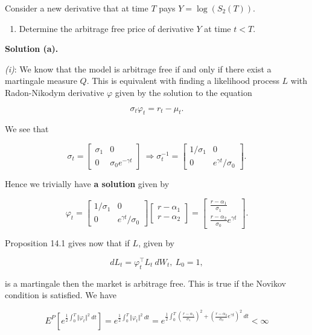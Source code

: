 \documentclass[
]{article}
\providecommand{\tightlist}{%
  \setlength{\itemsep}{0pt}\setlength{\parskip}{0pt}}
\begin{document}
Consider a new derivative that at time \(T\) pays \(Y=\log(S_2(T))\).

\begin{enumerate}
\def\labelenumi{\alph{enumi}.}
\setcounter{enumi}{2}
\tightlist
\item
  Determine the arbitrage free price of derivative \(Y\) at time
  \(t<T\).
\end{enumerate}

\textbf{Solution (a).}

\emph{(i)}: We know that the model is arbitrage free if and only if
there exist a martingale measure \(Q\). This is equivalent with finding
a likelihood process \(L\) with Radon-Nikodym derivative \(\varphi\)
given by the solution to the equation

\[
\sigma_t\varphi_t=r_t-\mu_t.
\]

We see that

\[
\sigma_t=
\begin{bmatrix}
\sigma_1 & 0\\
0 & \sigma_0e^{-\gamma t}
\end{bmatrix}\ \Rightarrow
\sigma_t^{-1}=
\begin{bmatrix}
1/\sigma_1 & 0\\
0 & e^{\gamma t}/\sigma_0
\end{bmatrix}.
\]

Hence we trivially have \textbf{a solution} given by

\[
\varphi_t=\begin{bmatrix}
1/\sigma_1 & 0\\
0 & e^{\gamma t}/\sigma_0
\end{bmatrix}\begin{bmatrix}
r-\alpha_1\\
r-\alpha_2
\end{bmatrix}=\begin{bmatrix}
\frac{r-\alpha_1}{\sigma_1}\\
\frac{r-\alpha_2}{\sigma_0}e^{\gamma t}
\end{bmatrix}.
\]

Proposition 14.1 gives now that if \(L\), given by

\[
dL_t=\varphi_t^\top L_t\ dW_t,\ L_0=1,
\]

is a martingale then the market is arbitrage free. This is true if the
Novikov condition is satisfied. We have

\[
E^P\left[e^{\frac{1}{2}\int_0^T\Vert\varphi_t\Vert^2\ dt}\right]=e^{\frac{1}{2}\int_0^T\Vert\varphi_t\Vert^2\ dt}= e^{\frac{1}{2}\int_0^T(\frac{r-\alpha_1}{\sigma_1})^2+(\frac{r-\alpha_2}{\sigma_0}e^{\gamma t})^2\ dt}<\infty
\]
\end{document}
